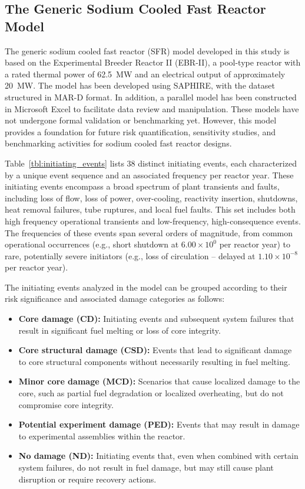 \subsection{The Generic Sodium Cooled Fast Reactor Model}

The generic sodium cooled fast reactor (SFR) model developed in this study is based on the Experimental Breeder Reactor II (EBR-II), a pool-type reactor with a rated thermal power of 62.5~MW and an electrical output of approximately 20~MW. The model has been developed using SAPHIRE, with the dataset structured in MAR-D format. In addition, a parallel model has been constructed in Microsoft Excel to facilitate data review and manipulation. These models have not undergone formal validation or benchmarking yet. However, this model provides a foundation for future risk quantification, sensitivity studies, and benchmarking activities for sodium cooled fast reactor designs.

Table~\ref{tbl:initiating_events} lists 38 distinct initiating events, each characterized by a unique event sequence and an associated frequency per reactor year. These initiating events encompass a broad spectrum of plant transients and faults, including loss of flow, loss of power, over-cooling, reactivity insertion, shutdowns, heat removal failures, tube ruptures, and local fuel faults. This set includes both high frequency operational transients and low-frequency, high-consequence events. The frequencies of these events span several orders of magnitude, from common operational occurrences (e.g., short shutdown at $6.00 \times 10^{0}$ per reactor year) to rare, potentially severe initiators (e.g., loss of circulation -- delayed at $1.10 \times 10^{-8}$ per reactor year).

The initiating events analyzed in the model can be grouped according to their risk significance and associated damage categories as follows:

\begin{itemize}
    \item \textbf{Core damage (CD):} Initiating events and subsequent system failures that result in significant fuel melting or loss of core integrity.
    \item \textbf{Core structural damage (CSD):} Events that lead to significant damage to core structural components without necessarily resulting in fuel melting.
    \item \textbf{Minor core damage (MCD):} Scenarios that cause localized damage to the core, such as partial fuel degradation or localized overheating, but do not compromise core integrity.
    \item \textbf{Potential experiment damage (PED):} Events that may result in damage to experimental assemblies within the reactor.
    \item \textbf{No damage (ND):} Initiating events that, even when combined with certain system failures, do not result in fuel damage, but may still cause plant disruption or require recovery actions.
\end{itemize}

